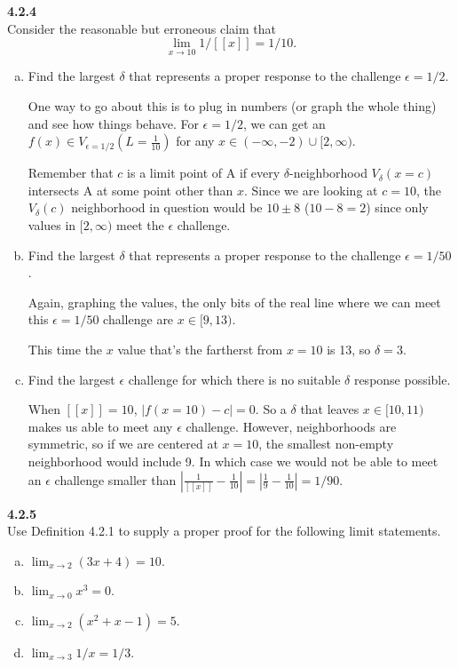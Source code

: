 \textbf{4.2.4}
\\

Consider the reasonable but erroneous claim that
$$
\lim_{x\rightarrow 10} 1/[[x]] = 1/10.
$$

\begin{enumerate}[(a)]
\item Find the largest $\delta$ that represents a proper response to the challenge $\epsilon = 1/2$.

One way to go about this is to plug in numbers (or graph the whole thing) and see how things behave.
For $\epsilon = 1/2$, we can get an $f(x) \in V_{\epsilon=1/2} (L=\frac{1}{10})$ for any $x \in (-\infty, -2) \cup [2, \infty)$.

Remember that $c$ is a limit point of A if every $\delta$-neighborhood
$V_{\delta} (x=c)$ intersects A at some point other than $x$.
Since we are looking at $c=10$, the $V_\delta (c)$ neighborhood in question would be $10 \pm 8$ ($10 - 8 = 2$) since only values in
$[2,\infty)$ meet the $\epsilon$ challenge.

\item Find the largest $\delta$ that represents a proper response to the challenge $\epsilon = 1/50$.

Again, graphing the values, the only bits of the real line where we can meet this $\epsilon = 1/50$ challenge are
$x \in [9, 13)$.

This time the $x$ value that's the fartherst from $x=10$ is 13, so $\delta = 3$.

\item Find the largest $\epsilon$ challenge for which there is no suitable $\delta$ response possible.

When $[[x]] = 10$, $|f(x=10) - c| = 0$.
So a $\delta$ that leaves $x \in [10, 11)$ makes us able to meet any $\epsilon$ challenge.
However, neighborhoods are symmetric, so if we are centered at $x=10$, the smallest non-empty neighborhood would include 9.
In which case we would not be able to meet an $\epsilon$ challenge smaller than
$|\frac{1}{[[x]]} - \frac{1}{10}| = |\frac{1}{9} - \frac{1}{10}| = 1 / 90$.

\end{enumerate}



\textbf{4.2.5}
\\

Use Definition 4.2.1 to supply a proper proof for the following limit statements.

\begin{enumerate}[(a)]
\item $\lim_{x\rightarrow 2} \left(3x + 4\right) = 10$.

\item $\lim_{x\rightarrow 0} x^3 = 0$.

\item $\lim_{x\rightarrow 2} \left(x^2 + x - 1\right) = 5$.

\item $\lim_{x\rightarrow 3} 1/x = 1/3$.
\end{enumerate}